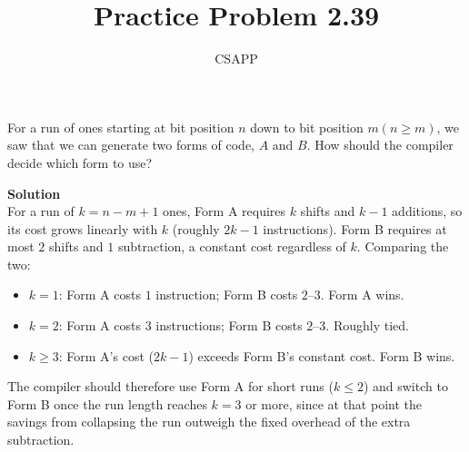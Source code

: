 \documentclass{article}
\title{Practice Problem 2.39}
\author{CSAPP}
\begin{document}
    \maketitle
    \begin{flushleft}
       For a run of ones starting at bit position $n$ down to bit position
       $m(n\geq m)$, we saw that we can generate two forms of code, $A$ and $B$.
       How should the compiler decide which form to use?

       \textbf{\small Solution}\\
        For a run of $k = n - m + 1$ ones, Form A requires $k$ shifts and
    $k-1$ additions, so its cost grows linearly with $k$ (roughly $2k-1$
    instructions). Form B requires at most $2$ shifts and $1$ subtraction,
    a constant cost regardless of $k$. Comparing the two:
    \begin{itemize}
        \item $k = 1$: Form A costs $1$ instruction; Form B costs $2$--$3$.
            Form A wins.
        \item $k = 2$: Form A costs $3$ instructions; Form B costs $2$--$3$.
            Roughly tied.
        \item $k \geq 3$: Form A's cost ($2k-1$) exceeds Form B's constant
            cost. Form B wins.
    \end{itemize}
    The compiler should therefore use Form A for short runs ($k \leq 2$)
    and switch to Form B once the run length reaches $k = 3$ or more,
    since at that point the savings from collapsing the run outweigh the
    fixed overhead of the extra subtraction.
       
    \end{flushleft}
\end{document}
